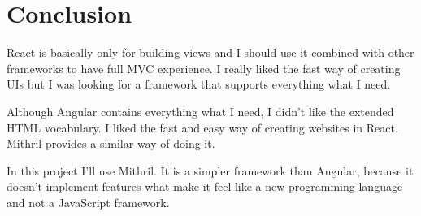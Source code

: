 \section{Conclusion}

React is basically only for building views and I should use it combined with other frameworks to have full MVC experience. I really liked the fast way of creating UIs but I was looking for a framework that supports everything what I need. 

Although Angular contains everything what I need, I didn't like the extended HTML vocabulary. I liked the fast and easy way of creating websites in React. Mithril provides a similar way of doing it. 

In this project I'll use Mithril. It is a simpler framework than Angular, because it doesn't implement features what make it feel like a new programming language and not a JavaScript framework.

